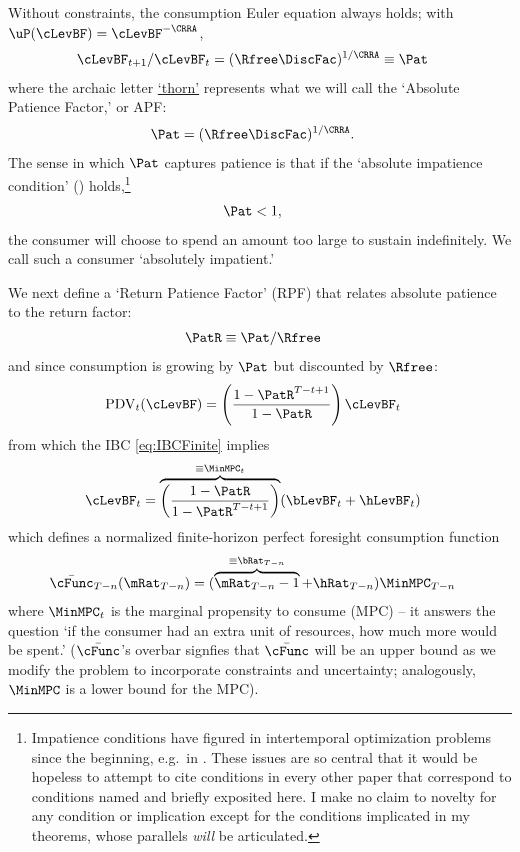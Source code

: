 \documentclass[BufferStockTheory]{subfiles}
\begin{document}
Without constraints, the consumption Euler equation always holds; with $\uP(\cLevBF)=\cLevBF^{-\CRRA}$, \hypertarget{Pat}{}
\begin{align}
  \cLevBF_{t+1}/\cLevBF_{t}  & = (\Rfree\DiscFac)^{1/\CRRA} \equiv \Pat   \label{eq:Pat}
\end{align}
where the archaic letter \href{https://en.wikipedia.org/wiki/Thorn_(letter)}{`thorn'} represents what we will call the `Absolute Patience Factor,' or APF:
\begin{align}
  \Pat & = (\Rfree\DiscFac)^{1/\CRRA} \label{eq:APF}.
\end{align}
The sense in which $\Pat$ captures patience is that if the `absolute impatience condition' (\AIC) holds,\footnote{Impatience conditions have figured in intertemporal optimization problems since the beginning, e.g.\ in \cite{ramseySave}.  These issues are so central that it would be hopeless to attempt to cite conditions in every other paper that correspond to conditions named and briefly exposited here.  I make no claim to novelty for any condition or implication except for the conditions implicated in my theorems, whose parallels \textit{will} be articulated.}
\begin{align}
  \label{eq:AIC}
  \Pat  & < 1,
\end{align}
the consumer will choose to spend an amount too large to sustain indefinitely.  We call such a consumer `absolutely impatient.'\hypertarget{RPF}{}

We next define a `Return Patience Factor' (RPF) that relates absolute patience to the return factor:
\begin{align}
  \PatR  & \equiv  {\Pat}/\Rfree \label{eq:PatR}
\end{align}
and since consumption is growing by $\Pat$ but discounted by $\Rfree$:
\begin{align}
  \mathrm{PDV}_{t}(\cLevBF)  & = \left(\frac{1-\PatR^{T-t+1}}{1-\PatR}\right)\cLevBF_{t}
\end{align}
from which the IBC \eqref{eq:IBCFinite} implies
\begin{align}
  \cLevBF_{t}  & = \overbrace{\left(\frac{1-\PatR}{1-\PatR^{T-t+1}}\right)}^{\equiv \MinMPC_{t}}
                 (\bLevBF_{t}+\hLevBF_{t})   \label{eq:WDef}
\end{align}
which defines a normalized finite-horizon perfect foresight consumption function
\begin{align}
  \bar{\cFunc}_{T-n}(\mRat_{T-n})  & = (\overbrace{\mRat_{T-n}-1}^{
                                     \equiv\bRat_{T-n}}+\hRat_{T-n})\MinMPC_{T-n}
\end{align}
where $\MinMPC_{t}$ is the marginal propensity to consume (MPC) -- it answers the
question `if the consumer had an extra unit of resources, how much more would be spent.' \hypertarget{RIC}{}
($\bar{\cFunc}$'s overbar signfies that $\bar{\cFunc}$ will be an upper bound as we modify the problem to incorporate constraints and uncertainty; analogously, $\MinMPC$ is a lower bound for the MPC).
\end{document}
